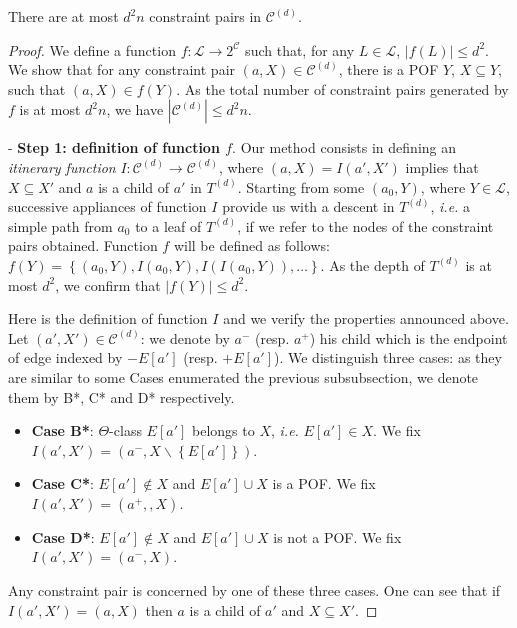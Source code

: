 \documentclass[a4paper,UKenglish,numberwithinsect,cleveref, autoref,anonymous]{lipics-v2021}
\newcommand{\set}[1]{\left\{ #1 \right\}}
\newcommand{\card}[1]{\left| #1 \right|}
\begin{document}
\begin{theorem}
There are at most $d^2n$ constraint pairs in $\mathcal{C}^{(d)}$.
\label{th:cardinality_c}
\end{theorem}
\begin{proof}
We define a function $f : \mathcal{L} \rightarrow 2^{\mathcal{C}}$ such that, for any $L \in \mathcal{L}$, $\card{f(L)} \le d^2$. We show that for any constraint pair $(a,X) \in \mathcal{C}^{(d)}$, there is a POF $Y$, $X \subseteq Y$, such that $(a,X) \in f(Y)$. As the total number of constraint pairs generated by $f$ is at most $d^2n$, we have $\card{\mathcal{C}^{(d)}} \le d^2n$.

- \textbf{Step 1: definition of function $f$}. Our method consists in defining an \textit{itinerary function} $I : \mathcal{C}^{(d)} \rightarrow \mathcal{C}^{(d)}$, where $(a,X) = I(a',X')$ implies that $X \subseteq X'$ and $a$ is a child of $a'$ in $T^{(d)}$. Starting from some $(a_0,Y)$, where $Y \in \mathcal{L}$, successive appliances of function $I$ provide us with a descent in $T^{(d)}$, {\em i.e.} a simple path from $a_0$ to a leaf of $T^{(d)}$, if we refer to the nodes of the constraint pairs obtained. Function $f$ will be defined as follows: $f(Y) = \set{(a_0,Y),I(a_0,Y),I(I(a_0,Y)),\ldots}$. As the depth of $T^{(d)}$ is at most $d^2$, we confirm that $\card{f(Y)}\le d^2$.

Here is the definition of function $I$ and we verify the properties announced above. Let $(a',X') \in \mathcal{C}^{(d)}$: we denote by $a^-$ (resp. $a^+$) his child which is the endpoint of edge indexed by $-E\left[a'\right]$ (resp. $+E\left[a'\right]$). We distinguish three cases: as they are similar to some Cases enumerated the previous subsubsection, we denote them by B*, C* and D* respectively.
\begin{itemize}
\item \textbf{Case B*}: $\Theta$-class $E\left[a'\right]$ belongs to $X$, {\em i.e.} $E\left[a'\right] \in X$. We fix $I(a',X') = (a^-,X\backslash \set{E\left[a'\right]})$.
\item \textbf{Case C*}: $E\left[a'\right] \notin X$ and $E\left[a'\right] \cup X$ is a POF. We fix $I(a',X') = (a^+,,X)$.
\item \textbf{Case D*}: $E\left[a'\right] \notin X$ and $E\left[a'\right] \cup X$ is not a POF. We fix $I(a',X') = (a^-,X)$.
\end{itemize}
Any constraint pair is concerned by one of these three cases. One can see that if $I(a',X') = (a,X)$ then $a$ is a child of $a'$ and $X \subseteq X'$.


\end{proof}
\end{document}
